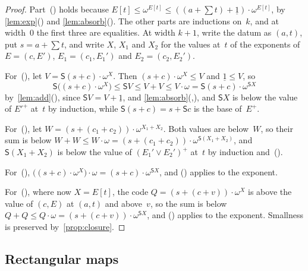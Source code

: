 \documentclass[11pt]{amsart}
\newcommand{\bS}{\mathsf{S}}
\newcommand{\bplus}{\mathbin{+}}
\newcommand{\btimes}{\mathbin{\cdot}}
\newcommand{\num}[1]{\underline{#1}}          %
\newcommand{\tsum}[1]{\textstyle\sum #1}
\newcommand{\act}[2]{#1[#2]}                  %
\theoremstyle{plain}
\theoremstyle{definition}
\begin{document}
\begin{proof}
Part~() holds because
$\act E t \le \omega^{\act E t} \le ((a \bplus \tsum t) \bplus \num 1)
\btimes \omega^{\act E t}$, by \cref{lem:exp}()
and \cref{lem:absorb}(). The other parts are
inductions on~$k$, and at width~$0$ the first three are equalities.
At width $k+1$, write the datum as $(a,t)$, put $s = a \bplus \tsum t$,
and write $X$, $X_1$ and $X_2$ for the values at~$t$ of the exponents
of $E = (c, E')$, $E_1 = (c_1, E_1')$ and $E_2 = (c_2, E_2')$.

For~(), let $V = \bS(s \bplus c) \btimes \omega^{X}$.
Then $(s \bplus c) \btimes \omega^{X} \le V$ and $\num 1 \le V$, so
\[
  \bS\big((s \bplus c) \btimes \omega^{X}\big)
  \le \bS V \le V \bplus V \le V \btimes \omega
  = \bS(s \bplus c) \btimes \omega^{\bS X}
\]
by~\cref{lem:add}(), since $\bS V = V \bplus
\num 1$, and
\cref{lem:absorb}(,),
and $\bS X$ is below the value of $E'^{+}$
at~$t$ by induction, while $\bS(s \bplus c) = s \bplus \bS c$ is the
base of~$E^{+}$.

For~(), let
$W = (s \bplus (c_1 \bplus c_2)) \btimes \omega^{X_1 \bplus X_2}$. Both
values are below~$W$, so their sum is below
$W \bplus W \le W \btimes \omega
 = (s \bplus (c_1 \bplus c_2)) \btimes \omega^{\bS(X_1 \bplus X_2)}$,
and $\bS(X_1 \bplus X_2)$ is below the value of
$(E_1' \vee E_2')^{+}$ at~$t$ by induction
and~().

For~(),
$\big((s \bplus c) \btimes \omega^{X}\big) \btimes \omega
 = (s \bplus c) \btimes \omega^{\bS X}$, and ()
applies to the exponent.

For~(), where now $X = \act E t$, the code
$Q = (s \bplus (c \bplus v)) \btimes \omega^{X}$ is above the value
of $(c, E)$ at $(a,t)$ and above~$v$, so the sum is below
$Q \bplus Q \le Q \btimes \omega
 = (s \bplus (c \bplus v)) \btimes \omega^{\bS X}$, and
() applies to the exponent. Smallness is preserved
by~\cref{prop:closure}.
\end{proof}

\subsection{Rectangular maps}
\label{sec:rect}
\end{document}
